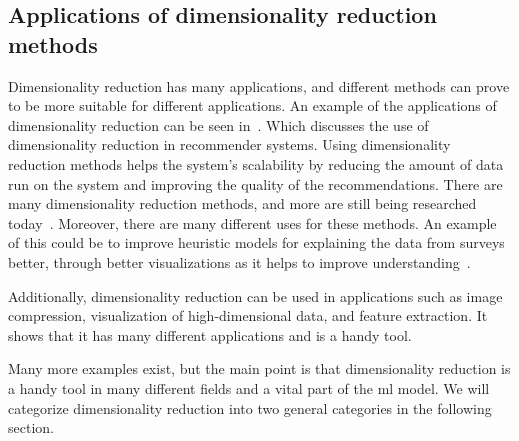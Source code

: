 \subsection{Applications of dimensionality reduction methods}

Dimensionality reduction has many applications, and different methods can prove to be more suitable for different applications. An example of the applications of dimensionality reduction can be seen in~\cite{sarwar2000application}. Which discusses the use of dimensionality reduction in recommender systems. Using dimensionality reduction methods helps the system's scalability by reducing the amount of data run on the system and improving the quality of the recommendations. 
There are many dimensionality reduction methods, and more are still being researched today~\cite{dimensionality-reduction-cheng}. Moreover, there are many different uses for these methods. An example of this could be to improve heuristic models for explaining the data from surveys better, through better visualizations as it helps to improve understanding~\cite{dimensionality-reduction-cheng}. 

Additionally, dimensionality reduction can be used in applications such as image compression, visualization of high-dimensional data, and feature extraction. It shows that it has many different applications and is a handy tool.

Many more examples exist, but the main point is that dimensionality reduction is a handy tool in many different fields and a vital part of the \gls{ml} model. We will categorize dimensionality reduction into two general categories in the following section.

